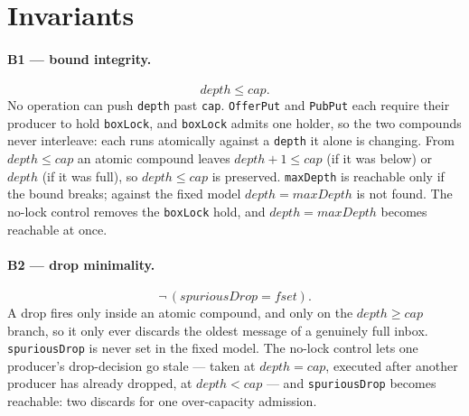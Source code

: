 \documentclass[a4paper,10pt,fleqn]{article}
\begin{document}
\section{Invariants}
\label{sec:inv}

\paragraph{B1 --- bound integrity.}
\[ depth \leq cap. \]
No operation can push \texttt{depth} past \texttt{cap}. \texttt{OfferPut} and
\texttt{PubPut} each require their producer to hold \texttt{boxLock}, and
\texttt{boxLock} admits one holder, so the two compounds never interleave: each
runs atomically against a \texttt{depth} it alone is changing. From
$depth \leq cap$ an atomic compound leaves $depth + 1 \leq cap$ (if it was below)
or $depth$ (if it was full), so $depth \leq cap$ is preserved. \texttt{maxDepth}
is reachable only if the bound breaks; against the fixed model $depth = maxDepth$
is not found. The no-lock control removes the \texttt{boxLock} hold, and
$depth = maxDepth$ becomes reachable at once.

\paragraph{B2 --- drop minimality.}
\[ \lnot\, (spuriousDrop = fset). \]
A drop fires only inside an atomic compound, and only on the $depth \geq cap$
branch, so it only ever discards the oldest message of a genuinely full inbox.
\texttt{spuriousDrop} is never set in the fixed model. The no-lock control lets
one producer's drop-decision go stale --- taken at $depth = cap$, executed after
another producer has already dropped, at $depth < cap$ --- and
\texttt{spuriousDrop} becomes reachable: two discards for one over-capacity
admission.
\end{document}
